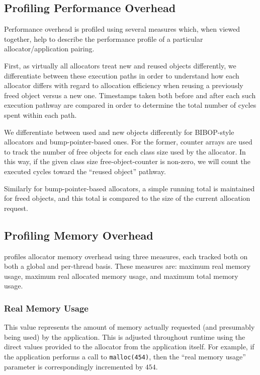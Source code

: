 \subsection{Profiling Performance Overhead}

Performance overhead is profiled using several measures which, when viewed together, help to describe the performance profile of a particular allocator/application pairing.

First, as virtually all allocators treat new and reused objects differently, we differentiate between these execution paths in order to understand how each allocator differs with regard to allocation efficiency when reusing a previously freed object versus a new one. Timestamps taken both before and after each such execution pathway are compared in order to determine the total number of cycles spent within each path.

We differentiate between used and new objects differently for BIBOP-style allocators and bump-pointer-based ones. For the former, counter arrays are used to track the number of free objects for each class size used by the allocator. In this way, if the given class size free-object-counter is non-zero, we will count the executed cycles toward the ``reused object'' pathway.

Similarly for bump-pointer-based allocators, a simple running total is maintained for freed objects, and this total is compared to the size of the current allocation request.


\subsection{Profiling Memory Overhead}
\MP{} profiles allocator memory overhead using three measures, each tracked both on both a global and per-thread basis. These measures are: maximum real memory usage, maximum real allocated memory usage, and maximum total memory usage.

\subsubsection{Real Memory Usage}
This value represents the amount of memory actually requested (and presumably being used) by the application. This is adjusted throughout runtime using the direct values provided to the allocator from the application itself. For example, if the application performs a call to \texttt{malloc(454)}, then the ``real memory usage'' parameter is correspondingly incremented by $454$.

